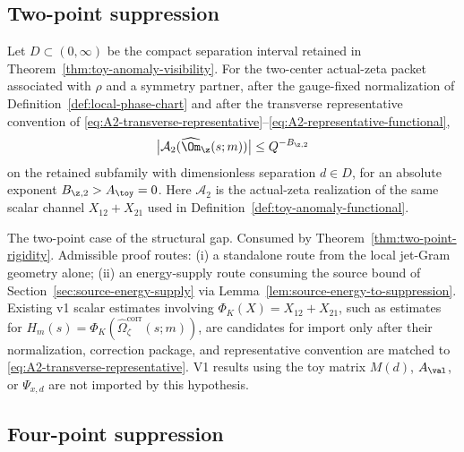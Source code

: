 \subsection{Two-point suppression}
\label{subsec:two-point-suppression}

\begin{hypothesis}
\label{hyp:zeta-suppression-two-point}
Let \(D\subset(0,\infty)\) be the compact separation interval retained
in Theorem~\ref{thm:toy-anomaly-visibility}.  For the two-center
actual-zeta packet associated with \(\rho\) and a symmetry partner, after
the gauge-fixed normalization of Definition~\ref{def:local-phase-chart}
and after the transverse representative convention of
\eqref{eq:A2-transverse-representative}--\eqref{eq:A2-representative-functional},
\begin{equation}
\label{eq:zeta-two-point-scalar-suppression}
        \bigl|\mathcal A_2(\widehat\Om_\z(s;m))\bigr|
        \le Q^{-B_{\z,2}}
\end{equation}
on the retained subfamily with dimensionless separation \(d\in D\), for
an absolute exponent \(B_{\z,2}>A_\toy=0\).  Here \(\mathcal A_2\) is
the actual-zeta realization of the same scalar channel
\(X_{12}+X_{21}\) used in
Definition~\ref{def:toy-anomaly-functional}.
\end{hypothesis}

\begin{wip}\label{rem:wip-zeta-suppression-two-point}
The two-point case of the structural gap.  Consumed by
Theorem~\ref{thm:two-point-rigidity}.  Admissible proof routes:
\textup{(i)} a standalone route from the local jet-Gram geometry alone;
\textup{(ii)} an energy-supply route consuming the source bound
of Section~\ref{sec:source-energy-supply} via
Lemma~\ref{lem:source-energy-to-suppression}.  Existing v1 scalar
estimates involving
\(\Phi_K(X)=X_{12}+X_{21}\), such as estimates for
\(H_m(s)=\Phi_K(\widehat\Omega_\zeta^{\mathrm{corr}}(s;m))\), are
candidates for import only after their normalization, correction package,
and representative convention are matched to
\eqref{eq:A2-transverse-representative}.  V1 results using the toy
matrix \(M(d)\), \(A_{\val}\), or \(\Psi_{x,d}\) are not imported by
this hypothesis.
\end{wip}

\subsection{Four-point suppression}
\label{subsec:four-point-suppression}

